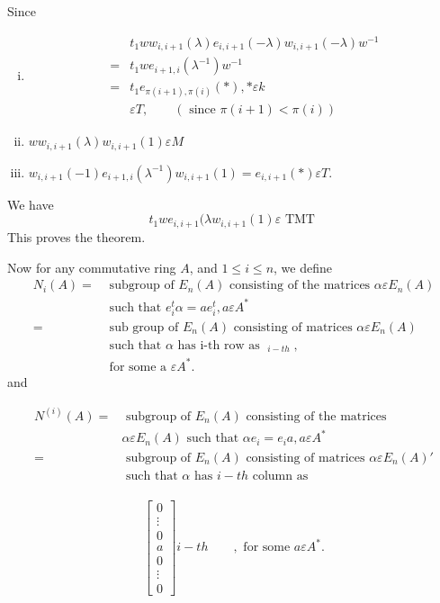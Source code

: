 \begin{Proof}
Since 
\begin{enumerate}[(i)]
\item $$
\begin{aligned}
&t_1ww_{i,i+1}(\lambda)e_{i,i+1}(-\lambda)w_{i,i+1}(-\lambda)w^{-1}\\
=&{}t_1we_{i+1,i}\left(\lambda^{-1}\right) w^{-1}\\
=&{}t_1e_{\pi(i+1),\pi(i)}(\ast),\ast \varepsilon k\\
&{}\varepsilon T,\qquad (\text{ since } \pi(i+1)<\pi(i))
\end{aligned}
$$
\item $ww_{i,i+1}(\lambda)w_{i,i+1}(1)\varepsilon M$
\item $w_{i,i+1}(-1)e_{i+1,i}\left(\lambda^{-1}\right)w_{i,i+1}(1)=e_{i,i+1}(\ast)\varepsilon T.$
\end{enumerate}

We have
$$
t_1we_{i,i+1}(\lambda w_{i,i+1}(1)\varepsilon \text{ TMT }
$$
This proves the theorem.
\enprf
\end{Proof}

Now for any commutative ring $A$, and $1\leq i \leq n$, we define
$$
\begin{aligned}
N_i(A)=& \text{ subgroup of } E_n(A) \text{ consisting of the matrices
  }\alpha
  \varepsilon E_n(A)\\ 
&{} \text{ such that } e^{t}_i\alpha=ae^{t}_i, a\varepsilon A^{\ast}\\
=&{}\text{ sub group of } E_n(A) \text{ consisting of matrices } \alpha\varepsilon
E_n(A)\\ 
&{}\text{ such that } \alpha \text{ has i-th row as } \displaystyle\mathop{(0,\ldots,0, a,
0,\ldots,0)}_{i-th},\\
&{}\text{ for some a }\varepsilon A^{\ast}.
\end{aligned}
$$
and 

$$
\begin{aligned}
N^{(i)}(A)=&\text{ subgroup of } E_n(A) \text{ consisting of the
  matrices }\\
&{} \alpha \varepsilon E_n(A) \text{ such that }\alpha e_i=e_ia,a\varepsilon A^{\ast}\\
=&{} \text{ subgroup of } E_n(A) \text{ consisting of matrices }
\alpha \varepsilon E_n(A)'\\
&{}\text{ such that } \alpha \text{ has } i-th \text{ column as }\\
\end{aligned}
$$

$$
\begin{bmatrix}
0\\
\vdots\\
0\\
a\\
0\\
\vdots\\
0
\end{bmatrix} i-th \qquad, \text{ for some } a\varepsilon A^{\ast}.
$$

